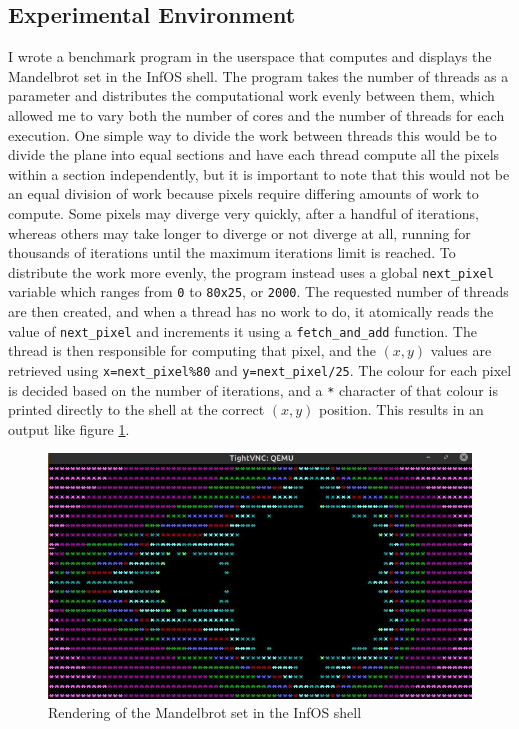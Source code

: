 \documentclass[bsc,frontabs,singlespacing,parskip,deptreport]{infthesis}     %
\begin{document}
\subsection{Experimental Environment} 
I wrote a benchmark program in the userspace that computes and displays the Mandelbrot set in the InfOS shell. The program takes the number of threads as a parameter and distributes the computational work evenly between them, which allowed me to vary both the number of cores and the number of threads for each execution. One simple way to divide the work between threads this would be to divide the plane into equal sections and have each thread compute all the pixels within a section independently, but it is important to note that this would not be an equal division of work because pixels require differing amounts of work to compute. Some pixels may diverge very quickly, after a handful of iterations, whereas others may take longer to diverge or not diverge at all, running for thousands of iterations until the maximum iterations limit is reached. To distribute the work more evenly, the program instead uses a global \verb|next_pixel| variable which ranges from \verb|0| to \verb|80x25|, or \verb|2000|. The requested number of threads are then created, and when a thread has no work to do, it atomically reads the value of \verb|next_pixel| and increments it using a \verb|fetch_and_add| function. The thread is then responsible for computing that pixel, and the $(x,y)$ values are retrieved using \verb|x=next_pixel%80| and \verb|y=next_pixel/25|. The colour for each pixel is decided based on the number of iterations, and a \verb|*| character of that colour is printed directly to the shell at the correct $(x,y)$ position. This results in an output like figure \ref{terminal-output}.

\begin{figure}[h]
    \centering
    \includegraphics[scale=0.8]{figures/terminal-output.jpg}
    \caption{Rendering of the Mandelbrot set in the InfOS shell}
    \label{terminal-output}
\end{figure}
\end{document}
